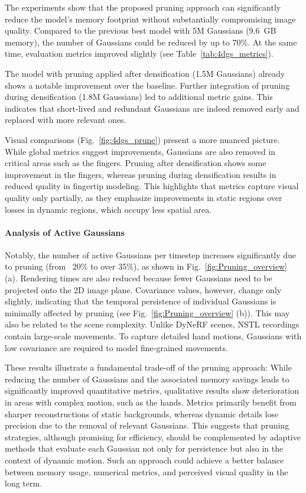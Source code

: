 The experiments show that the proposed pruning approach can significantly reduce the model's memory footprint without substantially compromising image quality. 
Compared to the previous best model with 5M Gaussians (9.6~GB memory), the number of Gaussians could be reduced by up to 70\%. 
At the same time, evaluation metrics improved slightly (see Table~\ref{tab:4dgs_metrics}). 

The model with pruning applied after densification (1.5M Gaussians) already shows a notable improvement over the baseline. 
Further integration of pruning during densification (1.8M Gaussians) led to additional metric gains. 
This indicates that short-lived and redundant Gaussians are indeed removed early and replaced with more relevant ones. 

Visual comparisons (Fig.~\ref{fig:4dgs_prune}) present a more nuanced picture. 
While global metrics suggest improvements, Gaussians are also removed in critical areas such as the fingers. 
Pruning after densification shows some improvement in the fingers, whereas pruning during densification results in reduced quality in fingertip modeling. 
This highlights that metrics capture visual quality only partially, as they emphasize improvements in static regions over losses in dynamic regions, which occupy less spatial area.  

\paragraph{Analysis of Active Gaussians}  

Notably, the number of active Gaussians per timestep increases significantly due to pruning (from ~20\% to over 35\%), as shown in Fig.~\ref{fig:Pruning_overview} (a). 
Rendering times are also reduced because fewer Gaussians need to be projected onto the 2D image plane. 
Covariance values, however, change only slightly, indicating that the temporal persistence of individual Gaussians is minimally affected by pruning (see Fig.~\ref{fig:Pruning_overview} (b)). 
This may also be related to the scene complexity. 
Unlike DyNeRF scenes, NSTL recordings contain large-scale movements. 
To capture detailed hand motions, Gaussians with low covariance are required to model fine-grained movements.

These results illustrate a fundamental trade-off of the pruning approach: 
While reducing the number of Gaussians and the associated memory savings leads to significantly improved quantitative metrics, qualitative results show deterioration in areas with complex motion, such as the hands. 
Metrics primarily benefit from sharper reconstructions of static backgrounds, whereas dynamic details lose precision due to the removal of relevant Gaussians. 
This suggests that pruning strategies, although promising for efficiency, should be complemented by adaptive methods that evaluate each Gaussian not only for persistence but also in the context of dynamic motion. 
Such an approach could achieve a better balance between memory usage, numerical metrics, and perceived visual quality in the long term.


